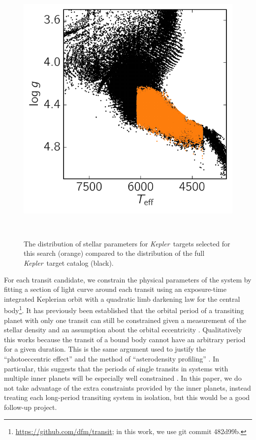 \documentclass[manuscript, letterpaper]{aastex6}
\makeatletter
\let\origsubsection\subsection
\renewcommand\subsection{\@ifstar{\starsubsection}{\nostarsubsection}}
\newcommand\nostarsubsection[1]{\subsectionprelude\origsubsection{#1}}
\newcommand\starsubsection[1]{\subsectionprelude\origsubsection*{#1}}
\newcommand\subsectionprelude{\vspace{1em}}
\newcommand{\project}[1]{\textsl{#1}}
\newcommand{\kepler}{\project{Kepler}}
\newcommand{\dfmfiglabel}[1]{\label{fig:#1}}
\newcommand{\paper}{paper}
\makeatother
\begin{document}
\begin{figure}~\\
\begin{center}
\includegraphics{figures/targets.pdf}
\end{center}
\caption{%
The distribution of stellar parameters for \kepler\ targets selected for this
search (orange) compared to the distribution of the full \kepler\ target
catalog (black).
\dfmfiglabel{targets}}~\\
\end{figure}


\subsection{Parameter estimation}

For each transit candidate, we constrain the physical parameters of the system
by fitting a section of light curve around each transit using an exposure-time
integrated  Keplerian orbit with a quadratic limb darkening law for the
central body\footnote{\url{https://github.com/dfm/transit}; in this work, we
use git commit \textsf{482d99b}.}.
It has previously been established that the orbital period of a transiting
planet with only one transit can still be constrained given a measurement of
the stellar density and an assumption about the orbital eccentricity \cite[for
example][]{Wang:2015, Osborn:2016}.
Qualitatively this works because the transit of a bound body cannot have an
arbitrary period for a given duration.
This is the same argument used to justify the ``photoeccentric effect''
\citep{Dawson:2012} and the method of ``asterodensity profiling''
\citep{Kipping:2014b}.
In particular, this suggests that the periods of single transits in systems
with multiple inner planets will be especially well constrained
\citep{Kipping:2012}.
In this \paper, we do not take advantage of the extra constraints provided by
the inner planets, instead treating each long-period transiting system in
isolation, but this would be a good follow-up project.
\end{document}
